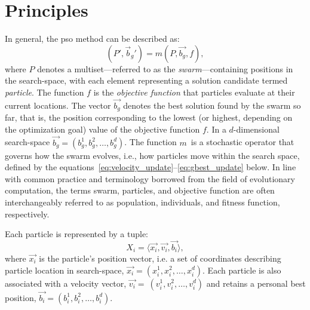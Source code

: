 {\section{Principles}








In general, the \acrfull{pso} method can be described as:
\begin{equation}\label{eq:pso}
(P', \vec{b}_g') = m(P, \vec{b_g}, f),
\end{equation}
where \(P\) denotes a multiset---referred to as the \textit{swarm}---containing positions in the \gls{search-space}, with each element representing a solution candidate termed \textit{particle}.
The function \(f\) is the \textit{objective function} that particles evaluate at their current locations.
The vector \(\vec{b_g}\) denotes the best solution found by the swarm so far, that is, the position corresponding to the lowest (or highest, depending on the optimization goal) value of the objective function \(f\).
In a \(d\)-dimensional \gls{search-space} \(\vec{b_g} = (b_{g}^{1}, b_{g}^{2}, \dots, b_{g}^{d}) \).
The function \(m\)~is a stochastic operator that governs how the swarm evolves, i.e., how particles move within the search space, defined by the equations~\eqref{eq:velocity_update}--\eqref{eq:gbest_update} below.
%
In line with common practice and terminology borrowed from the field of evolutionary computation, the terms swarm, particles, and objective function are often interchangeably referred to as population, individuals, and fitness function, respectively.

Each particle is represented by a tuple:
\begin{equation}\label{eq:particle}
X_i = \langle \vec{x_i}, \vec{v_{i}}, \vec{b_i} \rangle,
\end{equation}
where \(\vec{x_i}\) is the particle's position vector, i.e. a set of coordinates describing particle location in \gls{search-space},
\(\vec{x_i} = (x_{i}^{1}, x_{i}^{2}, \dots, x_{i}^{d})\). Each particle is also associated with a velocity vector, \(\vec{v_i} =\allowbreak\ (v_{i}^{1}, v_{i}^{2},\dots, v_{i}^{d})\) and retains a personal best position, 
\(\vec{b_i} = (b_{i}^{1}, b_{i}^{2}, \dots, b_{i}^{d}) \).



}
